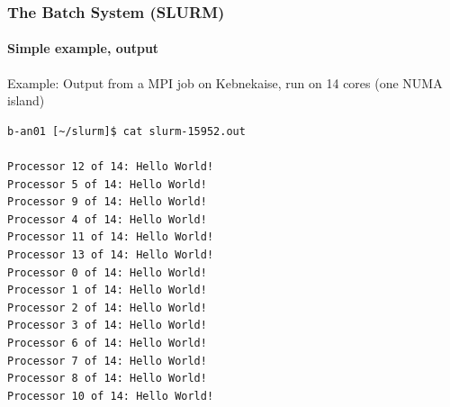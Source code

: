 \documentclass{beamer}
\begin{document}
\begin{frame}[fragile]\frametitle{The Batch System (SLURM)}\framesubtitle{Simple example, output} 

  \begin{block}{}
    \justify
Example: Output from a MPI job on Kebnekaise, run on 14 cores (one NUMA island)
  \end{block}

  \begin{block}{}
\begin{tiny}
\begin{verbatim}
b-an01 [~/slurm]$ cat slurm-15952.out 

Processor 12 of 14: Hello World!
Processor 5 of 14: Hello World!
Processor 9 of 14: Hello World!
Processor 4 of 14: Hello World!
Processor 11 of 14: Hello World!
Processor 13 of 14: Hello World!
Processor 0 of 14: Hello World!
Processor 1 of 14: Hello World!
Processor 2 of 14: Hello World!
Processor 3 of 14: Hello World!
Processor 6 of 14: Hello World!
Processor 7 of 14: Hello World!
Processor 8 of 14: Hello World!
Processor 10 of 14: Hello World!
\end{verbatim}
\end{tiny}
  \end{block}

\end{frame}



\end{document}
